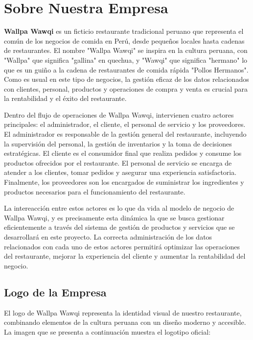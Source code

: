 \section{Sobre Nuestra Empresa}

  \textbf{Wallpa Wawqi} es un ficticio restaurante tradicional peruano que representa el común de los negocios de comida en Perú, desde pequeños locales hasta cadenas de restaurantes. El nombre "Wallpa Wawqi" se inspira en la cultura peruana, con "Wallpa" que significa "gallina" en quechua, y "Wawqi" que significa "hermano" lo que es un guiño a la cadena de restaurantes de comida rápida "Pollos Hermanos". Como es usual en este tipo de negocios, la gestión eficaz de los datos relacionados con clientes, personal, productos y operaciones de compra y venta es crucial para la rentabilidad y el éxito del restaurante.

  Dentro del flujo de operaciones de Wallpa Wawqi, intervienen cuatro actores principales: el administrador, el cliente, el personal de servicio y los proveedores. El administrador es responsable de la gestión general del restaurante, incluyendo la supervisión del personal, la gestión de inventarios y la toma de decisiones estratégicas. El cliente es el consumidor final que realiza pedidos y consume los productos ofrecidos por el restaurante. El personal de servicio se encarga de atender a los clientes, tomar pedidos y asegurar una experiencia satisfactoria. Finalmente, los proveedores son los encargados de suministrar los ingredientes y productos necesarios para el funcionamiento del restaurante.

  La intereacción entre estos actores es lo que da vida al modelo de negocio de Wallpa Wawqi, y es precisamente esta dinámica la que se busca gestionar eficientemente a través del sistema de gestión de productos y servicios que se desarrollará en este proyecto. La correcta administración de los datos relacionados con cada uno de estos actores permitirá optimizar las operaciones del restaurante, mejorar la experiencia del cliente y aumentar la rentabilidad del negocio.

  \subsection{Logo de la Empresa}

    El logo de Wallpa Wawqi representa la identidad visual de nuestro restaurante, combinando elementos de la cultura peruana con un diseño moderno y accesible. La imagen que se presenta a continuación muestra el logotipo oficial:

